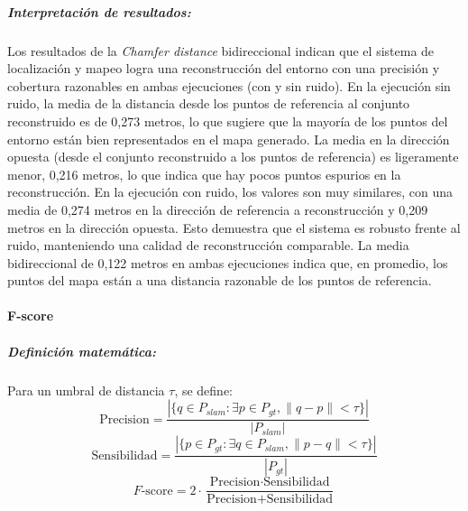 \documentclass[12pt, a4paper, twoside]{article}
\begin{document}
\newpage
\subparagraph{Interpretación de resultados:}
Los resultados de la \textit{Chamfer\cite{Fan2020Chamfer} distance} bidireccional indican que el sistema de localización y mapeo logra una reconstrucción del entorno con una precisión y 
cobertura razonables en ambas ejecuciones (con y sin ruido).
En la ejecución sin ruido, la media de la distancia desde los puntos de referencia al conjunto reconstruido es de 0,273 metros,
lo que sugiere que la mayoría de los puntos del entorno están bien representados en el mapa generado.
La media en la dirección opuesta (desde el conjunto reconstruido a los puntos de referencia) es ligeramente menor, 0,216 metros,
lo que indica que hay pocos puntos espurios en la reconstrucción.
En la ejecución con ruido, los valores son muy similares, con una media de 0,274 metros en la dirección de referencia a reconstrucción y
0,209 metros en la dirección opuesta. Esto demuestra que el sistema es robusto frente al ruido, manteniendo una calidad de reconstrucción comparable.\newline
La media bidireccional de 0,122 metros en ambas ejecuciones indica que, en promedio, los puntos del mapa están a una distancia razonable de los puntos de referencia.

\paragraph{F-score\cite{Caccia2018FScore}}

\subparagraph{Definición matemática:}
Para un umbral de distancia $\tau$, se define:
\[
\text{Precision} = \frac{|\{ q \in P_{slam} : \exists p \in P_{gt}, \|q-p\| < \tau \}|}{|P_{slam}|}
\]
\[
\text{Sensibilidad} = \frac{|\{ p \in P_{gt} : \exists q \in P_{slam}, \|p-q\| < \tau \}|}{|P_{gt}|}
\]
\[
F\text{-score} = 2 \cdot \frac{\text{Precision} \cdot \text{Sensibilidad}}{\text{Precision} + \text{Sensibilidad}}
\]
\end{document}
